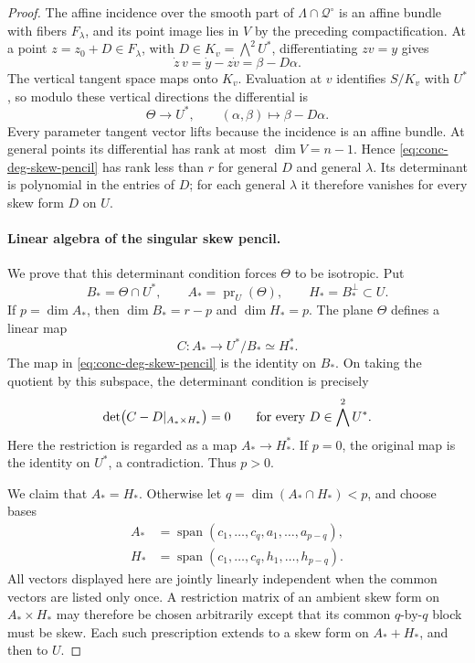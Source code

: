 \begin{proof}
The affine incidence over the smooth part of $\Lambda\cap\mathcal{Q}^\circ$ is an affine bundle with fibers $F_\lambda$, and its point image lies in $V$ by the preceding compactification.  At a point $z=z_0+D\in F_\lambda$, with $D\in K_v=\bigwedge^2U^*$, differentiating $zv=y$ gives
\[
 \dot z\,v=\dot y-z\dot v=\beta-D\alpha.
\]
The vertical tangent space maps onto $K_v$.  Evaluation at $v$ identifies $S/K_v$ with $U^*$, so modulo these vertical directions the differential is
\begin{equation}
 \Theta\longrightarrow U^*,
 \qquad (\alpha,\beta)\longmapsto\beta-D\alpha.
 \label{eq:conc-deg-skew-pencil}
\end{equation}
Every parameter tangent vector lifts because the incidence is an affine bundle.  At general points its differential has rank at most $\dim V=n-1$.  Hence \eqref{eq:conc-deg-skew-pencil} has rank less than $r$ for general $D$ and general $\lambda$.  Its determinant is polynomial in the entries of $D$; for each general $\lambda$ it therefore vanishes for every skew form $D$ on $U$.

\paragraph{Linear algebra of the singular skew pencil.}
We prove that this determinant condition forces $\Theta$ to be isotropic.  Put
\[
 B_*=\Theta\cap U^*,\qquad
 A_*=\operatorname{pr}_U(\Theta),\qquad
 H_*=B_*^\perp\subset U.
\]
If $p=\dim A_*$, then $\dim B_*=r-p$ and $\dim H_*=p$.  The plane $\Theta$ defines a linear map
\[
 C:A_*\longrightarrow U^*/B_*\simeq H_*^*.
\]
The map in \eqref{eq:conc-deg-skew-pencil} is the identity on $B_*$.  On taking the quotient by this subspace, the determinant condition is precisely
\begin{equation}
 \det\bigl(C-D|_{A_*\times H_*}\bigr)=0
 \qquad\hbox{for every }D\in\bigwedge^2U^*.
 \label{eq:conc-deg-quotient-pencil}
\end{equation}
Here the restriction is regarded as a map $A_*\to H_*^*$. If $p=0$, the original map is the identity on $U^*$, a contradiction.  Thus $p>0$.

We claim that $A_*=H_*$.  Otherwise let $q=\dim(A_*\cap H_*)<p$, and choose bases
\[
 \begin{split}
 A_*&=\operatorname{span}(c_1,\ldots,c_q,a_1,\ldots,a_{p-q}),\\
 H_*&=\operatorname{span}(c_1,\ldots,c_q,h_1,\ldots,h_{p-q}).
 \end{split}
\]
All vectors displayed here are jointly linearly independent when the common vectors are listed only once.  A restriction matrix of an ambient skew form on $A_*\times H_*$ may therefore be chosen arbitrarily except that its common $q$-by-$q$ block must be skew.  Each such prescription extends to a skew form on $A_*+H_*$, and then to $U$.


\end{proof}
